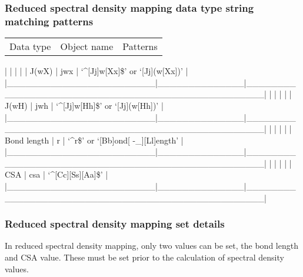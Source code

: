 \subsubsection{Reduced spectral density mapping data type string matching patterns}



\begin{tabular}{ccc}
Data type & Object name & Patterns \\
\end{tabular}
|                        |              |                                                  |
| J(wX)                  | jwx          | `\^{}[Jj]w[Xx]\$' or `[Jj](w[Xx])'                   |
|\_\_\_\_\_\_\_\_\_\_\_\_\_\_\_\_\_\_\_\_\_\_\_\_|\_\_\_\_\_\_\_\_\_\_\_\_\_\_|\_\_\_\_\_\_\_\_\_\_\_\_\_\_\_\_\_\_\_\_\_\_\_\_\_\_\_\_\_\_\_\_\_\_\_\_\_\_\_\_\_\_\_\_\_\_\_\_\_\_|
|                        |              |                                                  |
| J(wH)                  | jwh          | `\^{}[Jj]w[Hh]\$' or `[Jj](w[Hh])'                   |
|\_\_\_\_\_\_\_\_\_\_\_\_\_\_\_\_\_\_\_\_\_\_\_\_|\_\_\_\_\_\_\_\_\_\_\_\_\_\_|\_\_\_\_\_\_\_\_\_\_\_\_\_\_\_\_\_\_\_\_\_\_\_\_\_\_\_\_\_\_\_\_\_\_\_\_\_\_\_\_\_\_\_\_\_\_\_\_\_\_|
|                        |              |                                                  |
| Bond length            | r            | `\^{}r\$' or `[Bb]ond[ -\_][Ll]ength'                 |
|\_\_\_\_\_\_\_\_\_\_\_\_\_\_\_\_\_\_\_\_\_\_\_\_|\_\_\_\_\_\_\_\_\_\_\_\_\_\_|\_\_\_\_\_\_\_\_\_\_\_\_\_\_\_\_\_\_\_\_\_\_\_\_\_\_\_\_\_\_\_\_\_\_\_\_\_\_\_\_\_\_\_\_\_\_\_\_\_\_|
|                        |              |                                                  |
| CSA                    | csa          | `\^{}[Cc][Ss][Aa]\$'                                 |
|\_\_\_\_\_\_\_\_\_\_\_\_\_\_\_\_\_\_\_\_\_\_\_\_|\_\_\_\_\_\_\_\_\_\_\_\_\_\_|\_\_\_\_\_\_\_\_\_\_\_\_\_\_\_\_\_\_\_\_\_\_\_\_\_\_\_\_\_\_\_\_\_\_\_\_\_\_\_\_\_\_\_\_\_\_\_\_\_\_|



\subsubsection{Reduced spectral density mapping set details}

In reduced spectral density mapping, only two values can be set, the bond length and CSA
value.  These must be set prior to the calculation of spectral density values.



